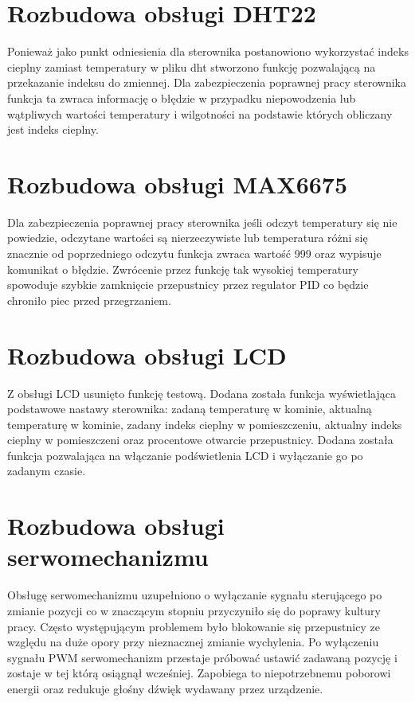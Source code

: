 \documentclass[11pt]{report}
\begin{document}
 \section{Rozbudowa obsługi DHT22}
 Ponieważ jako punkt odniesienia dla sterownika postanowiono wykorzystać indeks cieplny zamiast temperatury w pliku dht stworzono funkcję pozwalającą na przekazanie indeksu do zmiennej. Dla zabezpieczenia poprawnej pracy sterownika funkcja ta zwraca informację o błędzie w przypadku niepowodzenia lub wątpliwych wartości temperatury i wilgotności na podstawie których obliczany jest indeks cieplny. 

 \section{Rozbudowa obsługi MAX6675}
 Dla zabezpieczenia poprawnej pracy sterownika jeśli odczyt temperatury się nie powiedzie, odczytane wartości są nierzeczywiste lub temperatura różni się znacznie od poprzedniego odczytu funkcja zwraca wartość 999 oraz wypisuje komunikat o błędzie. Zwrócenie przez funkcję tak wysokiej temperatury spowoduje szybkie zamknięcie przepustnicy przez regulator PID co będzie chroniło piec przed przegrzaniem.
 
 \section{Rozbudowa obsługi LCD}
 Z obsługi LCD usunięto funkcję testową. Dodana została funkcja wyświetlająca podstawowe nastawy sterownika: zadaną temperaturę w kominie, aktualną temperaturę w kominie, zadany indeks cieplny w pomieszczeniu, aktualny indeks cieplny w pomieszczeni oraz procentowe otwarcie przepustnicy. Dodana została funkcja pozwalająca na włączanie podświetlenia LCD i wyłączanie go po zadanym czasie.

 \section{Rozbudowa obsługi serwomechanizmu}
 Obsługę serwomechanizmu uzupełniono o wyłączanie sygnału sterującego po zmianie pozycji co w znaczącym stopniu przyczyniło się do poprawy kultury pracy. Często występującym problemem było blokowanie się przepustnicy ze względu na duże opory przy nieznacznej zmianie wychylenia. Po wyłączeniu sygnału PWM serwomechanizm przestaje próbować ustawić zadawaną pozycję i zostaje w tej którą osiągnął wcześniej. Zapobiega to niepotrzebnemu poborowi energii oraz redukuje głośny dźwięk wydawany przez urządzenie.
\end{document}
